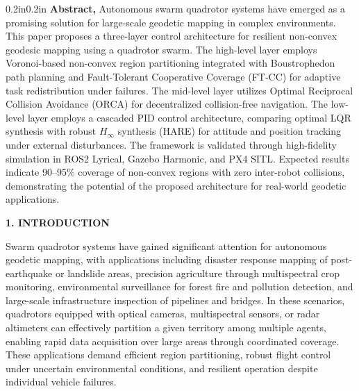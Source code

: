 \documentclass[11pt]{article}
\newcommand{\heading}[1]{%
  \vspace{1.3ex}%
  {\fontsize{10}{12}\bfseries #1}%
  \vspace{0.4ex}%
}
\newcommand{\pbody}{\fontsize{9}{11}\selectfont}
\begin{document}
\begin{adjustwidth}{0.2in}{0.2in}
      \pbody
      \textbf{Abstract,} Autonomous swarm quadrotor systems have emerged as a
      promising solution for large-scale geodetic mapping in complex environments.
      This paper proposes a three-layer control architecture for resilient non-convex
      geodesic mapping using a quadrotor swarm. The high-level layer employs
      Voronoi-based non-convex region partitioning integrated with Boustrophedon
      path planning and Fault-Tolerant Cooperative Coverage (FT-CC) for adaptive
      task redistribution under failures. The mid-level layer utilizes Optimal
      Reciprocal Collision Avoidance (ORCA) for decentralized collision-free
      navigation. The low-level layer employs a cascaded PID control architecture, comparing optimal LQR synthesis with robust $H_\infty$ synthesis (HARE) for attitude and position tracking under external disturbances. The framework is validated through high-fidelity simulation
      in ROS2 Lyrical, Gazebo Harmonic, and PX4 SITL. Expected results indicate
      90--95\% coverage of non-convex regions with zero inter-robot collisions,
      demonstrating the potential of the proposed architecture for real-world
      geodetic applications.
\end{adjustwidth}

\heading{1. INTRODUCTION}

\pbody
Swarm quadrotor systems have gained significant attention for autonomous
geodetic mapping, with applications including disaster response mapping of
post-earthquake or landslide areas, precision agriculture through
multispectral crop monitoring, environmental surveillance for forest fire
and pollution detection, and large-scale infrastructure inspection of
pipelines and bridges. In these scenarios, quadrotors equipped with optical
cameras, multispectral sensors, or radar altimeters can effectively
partition a given territory among multiple agents, enabling rapid data
acquisition over large areas through coordinated coverage. These
applications demand efficient region partitioning, robust flight control
under uncertain environmental conditions, and resilient operation despite
individual vehicle failures.
\end{document}
